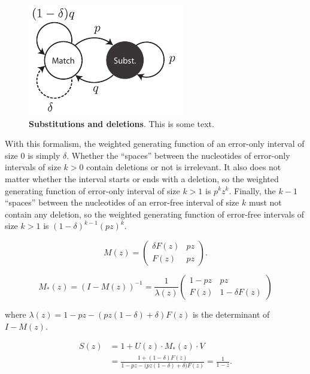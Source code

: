 \documentclass{article}
\begin{document}
\begin{figure}[h]
\centering
\includegraphics[scale=0.9]{deletions.pdf}
\caption{\textbf{Substitutions and deletions}. 
This is some text.}
\label{fig:deletions}
\end{figure}

With this formalism, the weighted generating function of an error-only
interval of size $0$ is simply $\delta$. Whether the ``spaces'' between
the nucleotides of error-only intervals of size $k > 0$ contain deletions
or not is irrelevant. It also does not matter whether the interval starts
or ends with a deletion, so the weighted generating function of error-only
interval of size $k>1$ is $p^kz^k$. Finally, the $k-1$ ``spaces'' between
the nucleotides of an error-free interval of size $k$ must not contain any
deletion, so the weighted generating function of error-free intervals of
size $k>1$ is $(1-\delta)^{k-1}(pz)^k$.

\begin{equation*}
M(z) = \left(
\begin{matrix}
\delta F(z) & pz \\
F(z)        & pz
\end{matrix}
\right).
\end{equation*}

\begin{equation*}
M_*(z) = (I-M(z))^{-1}=
\frac{1}{\lambda(z)}
\left(
\begin{matrix}
1-pz  & pz              \\
F(z) & 1 -\delta F(z)
\end{matrix}
\right)
\end{equation*}

\noindent
where $\lambda(z) = 1-pz-(pz(1-\delta)+\delta)F(z)$ is the determinant of
$I-M(z)$.

\begin{equation}
\label{eq:Sdel}
\begin{split}
S(z) &= 1 + U(z) \cdot M_*(z) \cdot V \\
&= \frac{1+(1-\delta)F(z)} {1-pz - \big(pz(1-\delta) + \delta\big)F(z)}
= \frac{1}{1-z}.
\end{split}
\end{equation}
\end{document}
